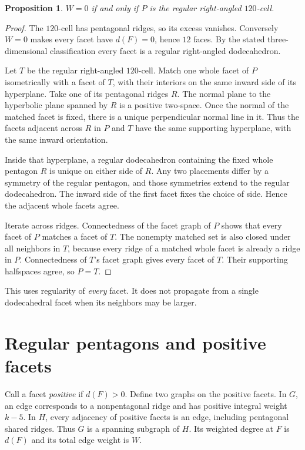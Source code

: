 \documentclass[11pt]{article}
\newtheorem{proposition}[theorem]{Proposition}
\theoremstyle{remark}
\begin{document}
\begin{proposition}\label{prop:zero}
$W=0$ if and only if $P$ is the regular right-angled $120$-cell.
\end{proposition}
\begin{proof}
The $120$-cell has pentagonal ridges, so its excess vanishes. Conversely
$W=0$ makes every facet have $d(F)=0$, hence $12$ faces. By the stated
three-dimensional classification every facet is a regular right-angled
dodecahedron.

Let $T$ be the regular right-angled $120$-cell. Match one whole facet
of $P$ isometrically with a facet of $T$, with their interiors on the
same inward side of its hyperplane. Take one of its pentagonal ridges
$R$. The normal plane to the hyperbolic plane spanned by $R$ is a
positive two-space. Once the normal of the matched facet is fixed,
there is a unique perpendicular normal line in it. Thus the facets
adjacent across $R$ in $P$ and $T$ have the same supporting hyperplane,
with the same inward orientation.

Inside that hyperplane, a regular dodecahedron containing the fixed
whole pentagon $R$ is unique on either side of $R$. Any two placements
differ by a symmetry of the regular pentagon, and those symmetries
extend to the regular dodecahedron. The inward side of the first
facet fixes the choice of side. Hence the adjacent whole facets agree.

Iterate across ridges. Connectedness of the facet graph of $P$ shows
that every facet of $P$ matches a facet of $T$. The nonempty matched
set is also closed under all neighbors in $T$, because every ridge
of a matched whole facet is already a ridge in $P$. Connectedness
of $T$'s facet graph gives every facet of $T$. Their supporting
halfspaces agree, so $P=T$.
\end{proof}

This uses regularity of \emph{every} facet. It does not propagate
from a single dodecahedral facet when its neighbors may be larger.

\section{Regular pentagons and positive facets}\label{sec:positive}

Call a facet \emph{positive} if $d(F)>0$. Define two graphs on the
positive facets. In $G$, an edge corresponds to a nonpentagonal ridge
and has positive integral weight $k-5$. In $H$, every adjacency of
positive facets is an edge, including pentagonal shared ridges. Thus
$G$ is a spanning subgraph of $H$. Its weighted degree at $F$ is
$d(F)$ and its total edge weight is $W$.
\end{document}
